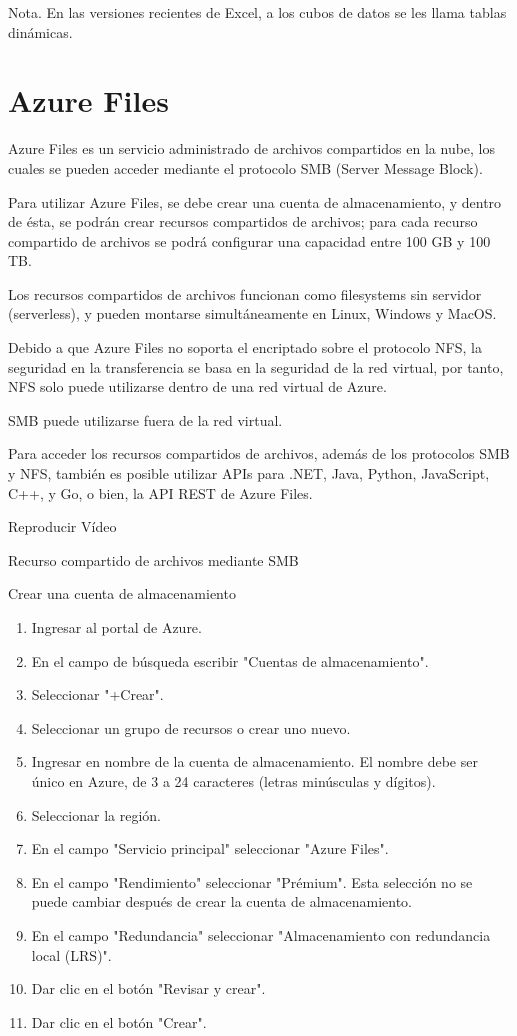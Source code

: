 Nota. En las versiones recientes de Excel, a los cubos de datos se les llama tablas dinámicas.

\clearpage


\chapter{Azure Files}

Azure Files es un servicio administrado de archivos compartidos en la nube, los cuales se pueden acceder mediante el protocolo SMB (Server Message Block).

Para utilizar Azure Files, se debe crear una cuenta de almacenamiento, y dentro de ésta, se podrán crear recursos compartidos de archivos; para cada recurso compartido de archivos se podrá configurar una capacidad entre 100 GB y 100 TB.

Los recursos compartidos de archivos funcionan como filesystems sin servidor (serverless), y pueden montarse simultáneamente en Linux, Windows y MacOS.

Debido a que Azure Files no soporta el encriptado sobre el protocolo NFS, la seguridad en la transferencia se basa en la seguridad de la red virtual, por tanto, NFS solo puede utilizarse dentro de una red virtual de Azure.

SMB puede utilizarse fuera de la red virtual.

Para acceder los recursos compartidos de archivos, además de los protocolos SMB y NFS, también es posible utilizar APIs para .NET, Java, Python, JavaScript, C++, y Go, o bien, la API REST de Azure Files.

Reproducir Vídeo

Recurso compartido de archivos mediante SMB

Crear una cuenta de almacenamiento

\begin{enumerate}
\item Ingresar al portal de Azure.
\item En el campo de búsqueda escribir "Cuentas de almacenamiento".
\item Seleccionar "+Crear".
\item Seleccionar un grupo de recursos o crear uno nuevo.
\item Ingresar en nombre de la cuenta de almacenamiento. El nombre debe ser único en Azure, de 3 a 24 caracteres (letras minúsculas y dígitos).
\item Seleccionar la región.
\item En el campo "Servicio principal" seleccionar "Azure Files".
\item En el campo "Rendimiento" seleccionar "Prémium". Esta selección no se puede cambiar después de crear la cuenta de almacenamiento.
\item En el campo "Redundancia" seleccionar "Almacenamiento con redundancia local (LRS)".
\item Dar clic en el botón "Revisar y crear".
\item Dar clic en el botón "Crear".
\end{enumerate}

